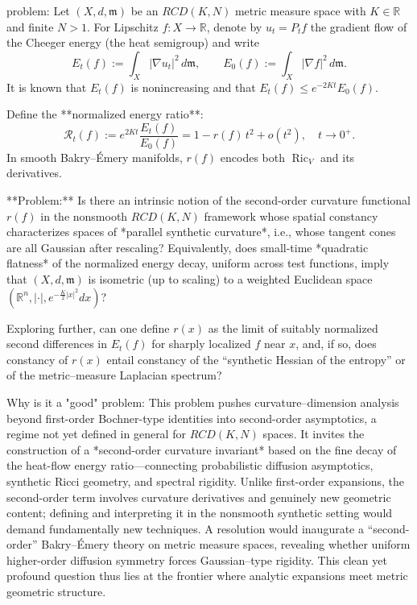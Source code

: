 problem:  
Let \((X,d,\mathfrak m)\) be an \(RCD(K,N)\) metric measure space with \(K\in\mathbb R\) and finite \(N>1\).  
For Lipschitz \(f:X\to\mathbb R\), denote by \(u_t=P_t f\) the gradient flow of the Cheeger energy (the heat semigroup) and write  
\[
E_t(f):=\int_X |\nabla u_t|^2\,d\mathfrak m,\qquad E_0(f):=\int_X |\nabla f|^2\,d\mathfrak m.
\]  
It is known that \(E_t(f)\) is nonincreasing and that \(E_t(f)\le e^{-2Kt}E_0(f)\).

Define the **normalized energy ratio**:
\[
\mathcal R_t(f):=e^{2Kt}\frac{E_t(f)}{E_0(f)}=1-r(f)\,t^2+o(t^2),\quad t\to0^+.
\]
In smooth Bakry–Émery manifolds, \(r(f)\) encodes both \(\operatorname{Ric}_V\) and its derivatives.  

**Problem:**  
Is there an intrinsic notion of the second-order curvature functional \(r(f)\) in the nonsmooth \(RCD(K,N)\) framework whose spatial constancy characterizes spaces of *parallel synthetic curvature*, i.e., whose tangent cones are all Gaussian after rescaling?  
Equivalently, does small-time *quadratic flatness* of the normalized energy decay, uniform across test functions, imply that \((X,d,\mathfrak m)\) is isometric (up to scaling) to a weighted Euclidean space \((\mathbb R^n,|\cdot|,e^{-\frac K2|x|^2}dx)\)?  

Exploring further, can one define \(r(x)\) as the limit of suitably normalized second differences in \(E_t(f)\) for sharply localized \(f\) near \(x\), and, if so, does constancy of \(r(x)\) entail constancy of the “synthetic Hessian of the entropy” or of the metric–measure Laplacian spectrum?

Why is it a "good" problem:  
This problem pushes curvature–dimension analysis beyond first-order Bochner-type identities into second-order asymptotics, a regime not yet defined in general for \(RCD(K,N)\) spaces. It invites the construction of a *second-order curvature invariant* based on the fine decay of the heat-flow energy ratio—connecting probabilistic diffusion asymptotics, synthetic Ricci geometry, and spectral rigidity.  
Unlike first-order expansions, the second-order term involves curvature derivatives and genuinely new geometric content; defining and interpreting it in the nonsmooth synthetic setting would demand fundamentally new techniques.  
A resolution would inaugurate a “second-order” Bakry–Émery theory on metric measure spaces, revealing whether uniform higher-order diffusion symmetry forces Gaussian–type rigidity. This clean yet profound question thus lies at the frontier where analytic expansions meet metric geometric structure.